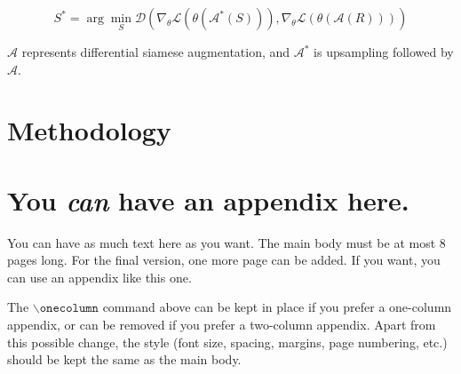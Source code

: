 \documentclass{article}
\theoremstyle{plain}
\theoremstyle{definition}
\theoremstyle{remark}
\begin{document}
\begin{equation}
S^* = \arg \min_{S} \mathcal{D} \left( \nabla_{\theta} \mathcal{L}(\theta(\mathcal{A}^*(S))), \nabla_{\theta} \mathcal{L}(\theta(\mathcal{A}(R))) \right)
\end{equation}

$\mathcal{A}$ represents differential siamese augmentation, and $\mathcal{A}^*$ is upsampling followed by $\mathcal{A}$.
\section{Methodology}




\nocite{langley00}





\newpage
\appendix
\onecolumn
\section{You \emph{can} have an appendix here.}

You can have as much text here as you want. The main body must be at most $8$ pages long.
For the final version, one more page can be added.
If you want, you can use an appendix like this one.  

The $\mathtt{\backslash onecolumn}$ command above can be kept in place if you prefer a one-column appendix, or can be removed if you prefer a two-column appendix.  Apart from this possible change, the style (font size, spacing, margins, page numbering, etc.) should be kept the same as the main body.
\end{document}
